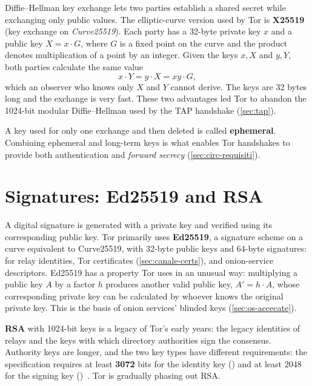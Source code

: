 Diffie--Hellman key exchange lets two parties establish a shared secret while exchanging only public values. The elliptic-curve version used by Tor is \textbf{X25519} (key exchange on \emph{Curve25519}). Each party has a 32-byte private key $x$ and a public key $X = x \cdot G$, where $G$ is a fixed point on the curve and the product denotes multiplication of a point by an integer. Given the keys $x, X$ and $y, Y$, both parties calculate the same value
\[ x \cdot Y = y \cdot X = xy \cdot G, \]
which an observer who knows only $X$ and $Y$ cannot derive. The keys are 32 bytes long and the exchange is very fast. These two advantages led Tor to abandon the 1024-bit modular Diffie--Hellman used by the TAP handshake (\cref{sec:tap}).

A key used for only one exchange and then deleted is called \textbf{ephemeral}. Combining ephemeral and long-term keys is what enables Tor handshakes to provide both authentication and \emph{forward secrecy} (\cref{sec:circ-requisiti}).

\section{Signatures: Ed25519 and RSA}\label{sec:cripto-firme}

A digital signature is generated with a private key and verified using its corresponding public key. Tor primarily uses \textbf{Ed25519}, a signature scheme on a curve equivalent to Curve25519, with 32-byte public keys and 64-byte signatures: for relay identities, Tor certificates (\cref{sec:canale-certs}), and onion-service descriptors. Ed25519 has a property Tor uses in an unusual way: multiplying a public key $A$ by a factor $h$ produces another valid public key, $A' = h \cdot A$, whose corresponding private key can be calculated by whoever knows the original private key. This is the basis of onion services' blinded keys (\cref{sec:os-accecate}).

\textbf{RSA} with 1024-bit keys is a legacy of Tor's early years: the legacy identities of relays and the keys with which directory authorities sign the consensus. Authority keys are longer, and the two key types have different requirements: the specification requires at least \textbf{3072} bits for the identity key () and at least 2048 for the signing key ()~. Tor is gradually phasing out RSA.

